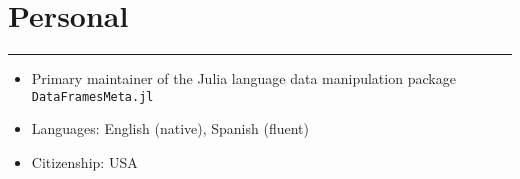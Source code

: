 \documentclass[10pt]{article}
\newenvironment{customitemize}
{ \begin{itemize}[leftmargin=\parindent, topsep = 0.2pt, itemsep = -3pt] }
{\end{itemize} }
\begin{document}
\section*{Personal}
\noindent \rule{\textwidth}{1pt} 
\begin{customitemize}
	\item Primary maintainer of the Julia language data manipulation package \texttt{DataFramesMeta.jl} 
	\item Languages: English (native), Spanish (fluent)
	\item Citizenship: USA
\end{customitemize}

\end{document}
